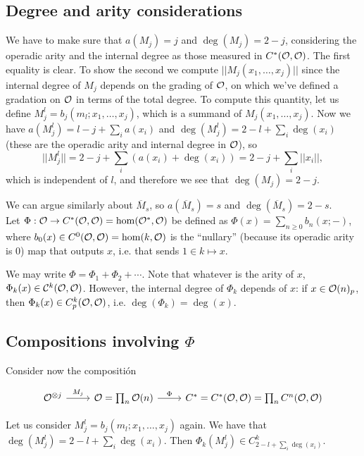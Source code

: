 \documentclass[twoside]{article}
\begin{document}
\subsection{Degree and arity considerations}

We have to make sure that $a(M_j)=j$ and $\deg(M_j)=2-j$, considering the operadic arity and the internal degree as those measured in $C^*({\mathcal O},{\mathcal O})$. The first equality is clear. To show the second we compute $||M_j(x_1,\dots, x_j)||$ since the internal degree of $M_j$ depends on the grading of ${\mathcal O}$, on which we've defined a gradation on ${\mathcal O}$ in terms of the total degree. To compute this quantity, let us define $M_j^l=b_j(m_l;x_1,\dots, x_j)$, which is a summand of $M_j(x_1,\dots, x_j)$. Now we have $a(M_j^l)=l-j+\sum_i a(x_i)$ and $\deg(M_j^l)=2-l+\sum_i \deg(x_i)$ (these are the operadic arity and internal degree in ${\mathcal O}$), so $$||M_j^l||=2-j+\sum_i(a(x_i)+\deg(x_i))=2-j+\sum_i||x_i||,$$ which is independent of $l$, and therefore we see that $\deg(M_j)=2-j$.

We can argue similarly about $\overline{M}_s$, so $a(\overline{M}_s)=s$ and $\deg(\overline{M}_s)=2-s$.\\

Let $\Phi:{\mathcal O}\to C^*({\mathcal O},{\mathcal O})=\hom({\mathcal O}^*,{\mathcal O})$ be defined as $\Phi(x)=\sum_{n\geq 0}b_n(x;-)$, where $b_0(x)\in C^0({\mathcal O},{\mathcal O})=\hom(k,{\mathcal O})$ is the ``nullary'' (because its operadic arity is 0) map that outputs $x$, i.e. that sends $1\in k\mapsto x$.  

We may write $\Phi=\Phi_1+\Phi_2+\cdots$. Note that whatever is the arity of $x$, $\Phi_k(x)\in{\mathcal C}^k({\mathcal O},{\mathcal O})$. However, the internal degree of $\Phi_k$ depends of $x$: if $x\in{\mathcal O}(n)_p$, then $\Phi_k(x)\in C^k_p({\mathcal O},{\mathcal O})$, i.e. $\deg(\Phi_k)=\deg(x)$. 


\subsection{Compositions involving $\Phi$}

Consider now the compositión 

\[
\begin{tikzcd}
\OO^{\otimes j}\arrow[r, "M_j"] & \OO=\prod_n\OO(n)\arrow[r,"\Phi"] &C^*=C^*(\OO,\OO)=\prod_n C^n(\OO,\OO)
\end{tikzcd}
\]

Let us consider $M_j^l=b_j(m_l;x_1,\dots, x_j)$ again. We have that %
$\deg(M_j^l)=2-l+\sum_i \deg(x_i)$. Then $\Phi_k(M_j^l)\in C^k_{2-l+\sum_i \deg(x_i)}$.
\end{document}
